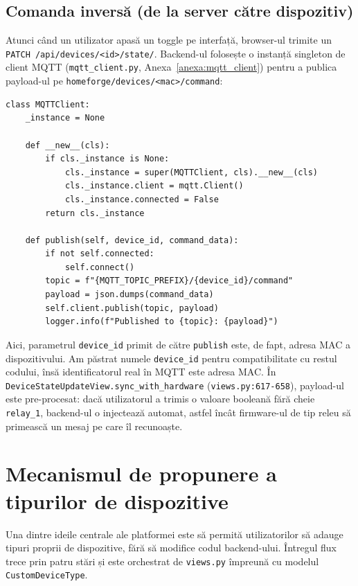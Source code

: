 \subsection{Comanda inversă (de la server către dispozitiv)}
Atunci când un utilizator apasă un toggle pe interfață, browser-ul trimite un \texttt{PATCH /api/devices/<id>/state/}. Backend-ul folosește o instanță singleton de client MQTT (\texttt{mqtt\_client.py}, Anexa~\ref{anexa:mqtt_client}) pentru a publica payload-ul pe \texttt{homeforge/devices/<mac>/command}:
\begin{verbatim}
class MQTTClient:
    _instance = None

    def __new__(cls):
        if cls._instance is None:
            cls._instance = super(MQTTClient, cls).__new__(cls)
            cls._instance.client = mqtt.Client()
            cls._instance.connected = False
        return cls._instance

    def publish(self, device_id, command_data):
        if not self.connected:
            self.connect()
        topic = f"{MQTT_TOPIC_PREFIX}/{device_id}/command"
        payload = json.dumps(command_data)
        self.client.publish(topic, payload)
        logger.info(f"Published to {topic}: {payload}")
\end{verbatim}
Aici, parametrul \texttt{device\_id} primit de către \texttt{publish} este, de fapt, adresa MAC a dispozitivului. Am păstrat numele \texttt{device\_id} pentru compatibilitate cu restul codului, însă identificatorul real în MQTT este adresa MAC. În \texttt{DeviceStateUpdateView.sync\_with\_hardware} (\texttt{views.py:617-658}), payload-ul este pre-procesat: dacă utilizatorul a trimis o valoare booleană fără cheie \texttt{relay\_1}, backend-ul o injectează automat, astfel încât firmware-ul de tip releu să primească un mesaj pe care îl recunoaște.

\section{Mecanismul de propunere a tipurilor de dispozitive}
Una dintre ideile centrale ale platformei este să permită utilizatorilor să adauge tipuri proprii de dispozitive, fără să modifice codul backend-ului. Întregul flux trece prin patru stări și este orchestrat de \texttt{views.py} împreună cu modelul \texttt{CustomDeviceType}.

